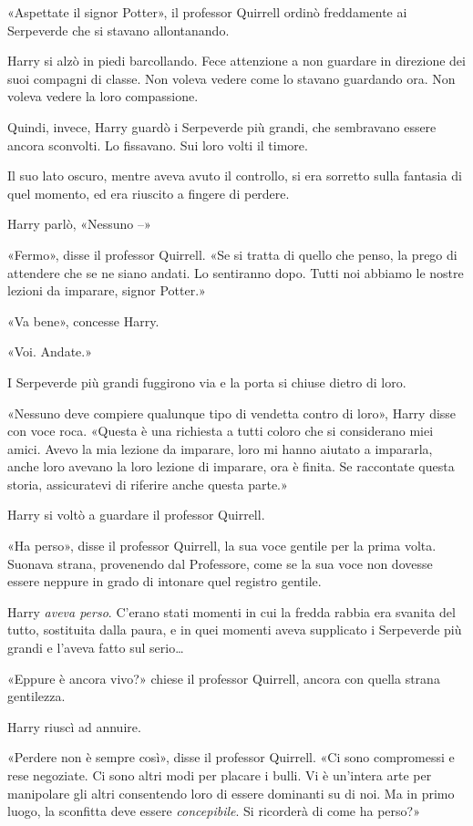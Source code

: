 «Aspettate il signor Potter», il professor Quirrell ordinò freddamente ai Serpeverde che si stavano allontanando.

Harry si alzò in piedi barcollando. Fece attenzione a non guardare in direzione dei suoi compagni di classe. Non voleva vedere come lo stavano guardando ora. Non voleva vedere la loro compassione.

Quindi, invece, Harry guardò i Serpeverde più grandi, che sembravano essere ancora sconvolti. Lo fissavano. Sui loro volti il timore.

Il suo lato oscuro, mentre aveva avuto il controllo, si era sorretto sulla fantasia di quel momento, ed era riuscito a fingere di perdere.

Harry parlò, «Nessuno –»

«Fermo», disse il professor Quirrell. «Se si tratta di quello che penso, la prego di attendere che se ne siano andati. Lo sentiranno dopo. Tutti noi abbiamo le nostre lezioni da imparare, signor Potter.»

«Va bene», concesse Harry.

«Voi. Andate.»

I Serpeverde più grandi fuggirono via e la porta si chiuse dietro di loro.

«Nessuno deve compiere qualunque tipo di vendetta contro di loro», Harry disse con voce roca. «Questa è una richiesta a tutti coloro che si considerano miei amici. Avevo la mia lezione da imparare, loro mi hanno aiutato a impararla, anche loro avevano la loro lezione di imparare, ora è finita. Se raccontate questa storia, assicuratevi di riferire anche questa parte.»

Harry si voltò a guardare il professor Quirrell.

«Ha perso», disse il professor Quirrell, la sua voce gentile per la prima volta. Suonava strana, provenendo dal Professore, come se la sua voce non dovesse essere neppure in grado di intonare quel registro gentile.

Harry \textit{aveva perso}. C’erano stati momenti in cui la fredda rabbia era svanita del tutto, sostituita dalla paura, e in quei momenti aveva supplicato i Serpeverde più grandi e l’aveva fatto sul serio…

«Eppure è ancora vivo?» chiese il professor Quirrell, ancora con quella strana gentilezza.

Harry riuscì ad annuire.

«Perdere non è sempre così», disse il professor Quirrell. «Ci sono compromessi e rese negoziate. Ci sono altri modi per placare i bulli. Vi è un’intera arte per manipolare gli altri consentendo loro di essere dominanti su di noi. Ma in primo luogo, la sconfitta deve essere \textit{concepibile}. Si ricorderà di come ha perso?»

